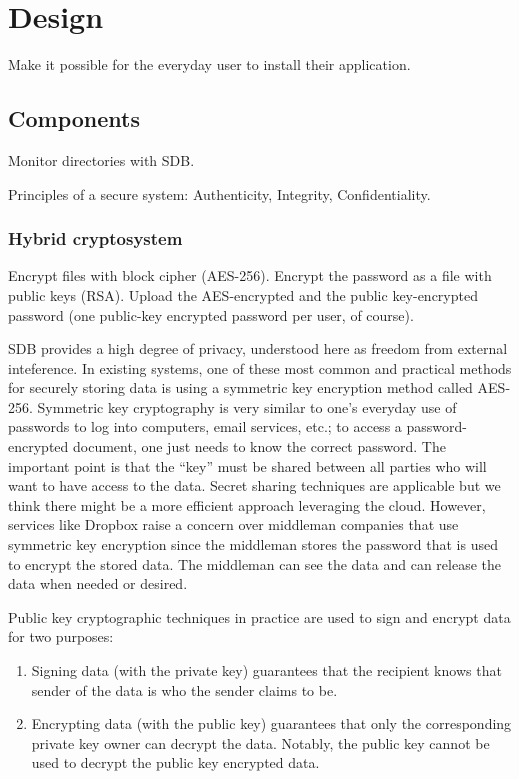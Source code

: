 \section{Design}

Make it possible for the everyday user to install their application.

\subsection{Components}

Monitor directories with SDB.

Principles of a secure system: Authenticity, Integrity,
Confidentiality.

\subsubsection*{Hybrid cryptosystem}
Encrypt files with block cipher (AES-256). Encrypt the password as a
file with public keys (RSA).  Upload the AES-encrypted and the public
key-encrypted password (one public-key encrypted password per user, of
course).

SDB provides a high degree of privacy, understood here as freedom from
external inteference. In existing systems, one of these most common
and practical methods for securely storing data is using a symmetric
key encryption method called AES-256. Symmetric key cryptography is
very similar to one's everyday use of passwords to log into computers,
email services, etc.; to access a password-encrypted document, one
just needs to know the correct password. The important point is that
the ``key'' must be shared between all parties who will want to have
access to the data. Secret sharing techniques are applicable but we
think there might be a more efficient approach leveraging the
cloud. However, services like Dropbox raise a concern over middleman
companies that use symmetric key encryption since the middleman stores
the password that is used to encrypt the stored data. The middleman
can see the data and can release the data when needed or desired.

Public key cryptographic techniques in practice are used to sign and
encrypt data for two purposes: 
\begin{enumerate}
\item Signing data (with the private key) guarantees that the
  recipient knows that sender of the data is who the sender claims to
  be.
\item Encrypting data (with the public key) guarantees that only the
  corresponding private key owner can decrypt the data. Notably, the
  public key cannot be used to decrypt the public key encrypted data.
\end{enumerate}

